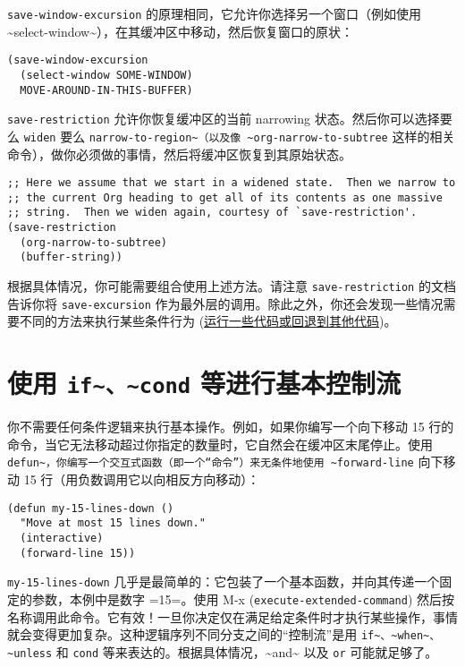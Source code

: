 \documentclass[11pt]{ctexart}
\begin{document}
\texttt{save-window-excursion} 的原理相同，它允许你选择另一个窗口（例如使用 \textasciitilde{}select-window\textasciitilde{}），在其缓冲区中移动，然后恢复窗口的原状：

\begin{verbatim}
(save-window-excursion
  (select-window SOME-WINDOW)
  MOVE-AROUND-IN-THIS-BUFFER)
\end{verbatim}

\texttt{save-restriction} 允许你恢复缓冲区的当前 narrowing 状态。然后你可以选择要么 \texttt{widen} 要么 \texttt{narrow-to-region\textasciitilde{}（以及像 \textasciitilde{}org-narrow-to-subtree} 这样的相关命令），做你必须做的事情，然后将缓冲区恢复到其原始状态。

\begin{verbatim}
;; Here we assume that we start in a widened state.  Then we narrow to
;; the current Org heading to get all of its contents as one massive
;; string.  Then we widen again, courtesy of `save-restriction'.
(save-restriction
  (org-narrow-to-subtree)
  (buffer-string))
\end{verbatim}

根据具体情况，你可能需要组合使用上述方法。请注意 \texttt{save-restriction} 的文档告诉你将 \texttt{save-excursion} 作为最外层的调用。除此之外，你还会发现一些情况需要不同的方法来执行某些条件行为 (\hyperref[sec:org16c56bc]{运行一些代码或回退到其他代码})。
\section{使用 \texttt{if\textasciitilde{}、\textasciitilde{}cond} 等进行基本控制流}
\label{sec:org9ad3ad6}
你不需要任何条件逻辑来执行基本操作。例如，如果你编写一个向下移动 15 行的命令，当它无法移动超过你指定的数量时，它自然会在缓冲区末尾停止。使用 \texttt{defun\textasciitilde{}，你编写一个交互式函数（即一个“命令”）来无条件地使用 \textasciitilde{}forward-line} 向下移动 15 行（用负数调用它以向相反方向移动）：

\begin{verbatim}
(defun my-15-lines-down ()
  "Move at most 15 lines down."
  (interactive)
  (forward-line 15))
\end{verbatim}

\texttt{my-15-lines-down} 几乎是最简单的：它包装了一个基本函数，并向其传递一个固定的参数，本例中是数字 =15=。使用 M-x (\texttt{execute-extended-command}) 然后按名称调用此命令。它有效！一旦你决定仅在满足给定条件时才执行某些操作，事情就会变得更加复杂。这种逻辑序列不同分支之间的“控制流”是用 \texttt{if\textasciitilde{}、\textasciitilde{}when\textasciitilde{}、\textasciitilde{}unless} 和 \texttt{cond} 等来表达的。根据具体情况，\textasciitilde{}and\textasciitilde{} 以及 \texttt{or} 可能就足够了。
\end{document}
